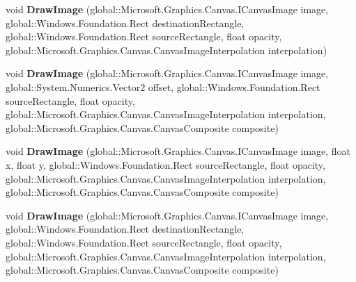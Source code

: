 \begin{DoxyCompactItemize}
void {\bfseries Draw\+Image} (global\+::\+Microsoft.\+Graphics.\+Canvas.\+I\+Canvas\+Image image, global\+::\+Windows.\+Foundation.\+Rect destination\+Rectangle, global\+::\+Windows.\+Foundation.\+Rect source\+Rectangle, float opacity, global\+::\+Microsoft.\+Graphics.\+Canvas.\+Canvas\+Image\+Interpolation interpolation)
\item 
\mbox{\label{interface_microsoft_1_1_graphics_1_1_canvas_1_1_i_canvas_drawing_session_a8b677c4de87ab3a0d18e8a4e7904562e}} 
void {\bfseries Draw\+Image} (global\+::\+Microsoft.\+Graphics.\+Canvas.\+I\+Canvas\+Image image, global\+::\+System.\+Numerics.\+Vector2 offset, global\+::\+Windows.\+Foundation.\+Rect source\+Rectangle, float opacity, global\+::\+Microsoft.\+Graphics.\+Canvas.\+Canvas\+Image\+Interpolation interpolation, global\+::\+Microsoft.\+Graphics.\+Canvas.\+Canvas\+Composite composite)
\item 
\mbox{\label{interface_microsoft_1_1_graphics_1_1_canvas_1_1_i_canvas_drawing_session_a68dcdebbbb8491e7b5423f40b2a6349e}} 
void {\bfseries Draw\+Image} (global\+::\+Microsoft.\+Graphics.\+Canvas.\+I\+Canvas\+Image image, float x, float y, global\+::\+Windows.\+Foundation.\+Rect source\+Rectangle, float opacity, global\+::\+Microsoft.\+Graphics.\+Canvas.\+Canvas\+Image\+Interpolation interpolation, global\+::\+Microsoft.\+Graphics.\+Canvas.\+Canvas\+Composite composite)
\item 
\mbox{\label{interface_microsoft_1_1_graphics_1_1_canvas_1_1_i_canvas_drawing_session_a993f83bad2b787c45b41d577a3f93f10}} 
void {\bfseries Draw\+Image} (global\+::\+Microsoft.\+Graphics.\+Canvas.\+I\+Canvas\+Image image, global\+::\+Windows.\+Foundation.\+Rect destination\+Rectangle, global\+::\+Windows.\+Foundation.\+Rect source\+Rectangle, float opacity, global\+::\+Microsoft.\+Graphics.\+Canvas.\+Canvas\+Image\+Interpolation interpolation, global\+::\+Microsoft.\+Graphics.\+Canvas.\+Canvas\+Composite composite)
\item 
\mbox{\label{interface_microsoft_1_1_graphics_1_1_canvas_1_1_i_canvas_drawing_session_acf7e6993427ce05997a8eb83b4be05dc}} 

\end{DoxyCompactItemize}
